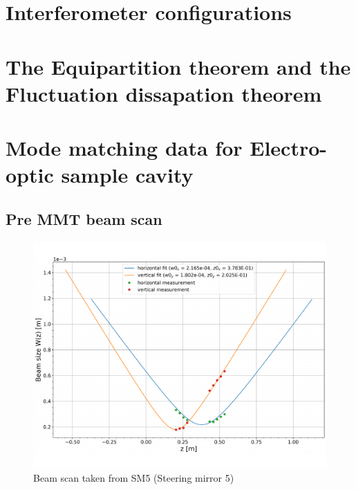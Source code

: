

\section{Interferometer configurations}
%
%
%



\section{The Equipartition theorem and the Fluctuation dissapation theorem}

\newpage


\section{Mode matching data for Electro-optic sample cavity}
\subsection{Pre MMT beam scan}

\begin{figure}[H]
\includegraphics[width=\textwidth]{figs/ALGAAS/beam_scans/12_18_2020_preMMT.pdf}
\caption{Beam scan taken from SM5 (Steering mirror 5)}
\label{fig:beam_scan_2020}
\end{figure}



